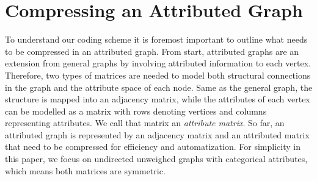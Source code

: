 \section{Compressing an Attributed Graph}
To understand our coding scheme it is foremost important to outline what needs to be compressed in an attributed graph. From start, attributed graphs are an extension from general graphs by involving attributed information to each vertex. Therefore, two types of matrices are needed to model both structural connections in the graph and the attribute space of each node. Same as the general graph, the structure is mapped into an adjacency matrix, while the attributes of each vertex can be modelled as a matrix with rows denoting vertices and columns representing attributes.  We call that matrix an \emph{attribute matrix}. So far, an attributed graph is represented by an adjacency matrix and an attributed matrix that need to be compressed for efficiency and automatization. For simplicity in this paper, we focus on undirected unweighed graphs with categorical attributes, which means both matrices are symmetric.

